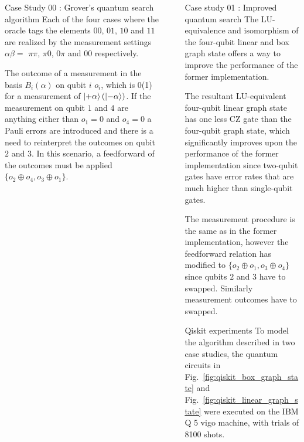 \documentclass[final]{beamer}
\newlength{\sepwidth}
\newlength{\colwidth}
\newcommand{\separatorcolumn}{\begin{column}{\sepwidth}\end{column}}
\begin{document}
\begin{frame}[t]
\begin{columns}[t]
\begin{column}{\colwidth}
\begin{block}{Case Study 00 : Grover's quantum search algorithm}
                    Each of the four cases where the oracle tags the elements
                    $00$, $01$, $10$ and $11$ are realized by the measurement
                    settings $\alpha\beta = $ $\pi\pi$, $\pi0$, $0\pi$ and $00$
                    respectively.

                    The outcome of a measurement in the basis $B_i(\alpha)$ on
                    qubit $i$ $o_i$, which is 0(1) for a measurement of
                    $\ket{+\alpha}(\ket{-\alpha})$.  If the measurement on qubit
                    $1$ and $4$ are anything either than $o_1= 0$ and $o_4= 0$ a
                    Pauli errors are introduced and there is a need to
                    reinterpret the outcomes on qubit $2$ and $3$. In this
                    scenario, a feedforward  of the outcomes must be applied 
                    $\{o_2 \oplus o_4, o_3 \oplus o_ 1\}$.
                \end{block}
            \end{column}

            \separatorcolumn

            \begin{column}{\colwidth}
                \begin{block}{Case study 01 : Improved quantum search}
                    The LU-equivalence and isomorphism of the four-qubit linear and box
                    graph state offers a way to improve the performance of the
                    former implementation.

                    The resultant LU-equivalent four-qubit
                    linear graph state has one less $\text{CZ}$ gate than the
                    four-qubit graph state, which significantly improves upon
                    the performance of the former implementation since two-qubit
                    gates have error rates that are much higher than
                    single-qubit gates.

                    The measurement procedure is the same as in the former
                    implementation, however the feedforward relation has
                    modified to $\{o_2 \oplus o_1, o_3 \oplus o_4 \}$ since
                    qubits $2$ and $3$ have to swapped. Similarly measurement outcomes have
                    to swapped.

                \end{block}
                \begin{block}{Qiskit experiments}
                    To model the algorithm described in two case studies, the
                    quantum circuits  in Fig.~\ref{fig:qiskit_box_graph_state}
                    and Fig.~\ref{fig:qiskit_linear_graph_state} were executed on the
                    IBM Q 5 vigo machine, with trials of 8100 shots.


\end{block}
\end{column}
\end{columns}
\end{frame}
\end{document}
